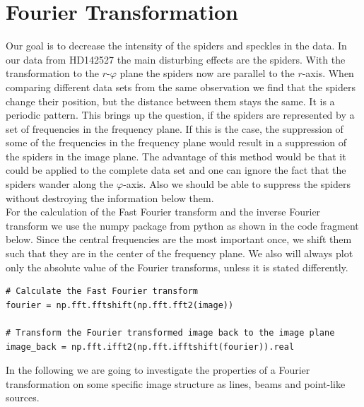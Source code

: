 \section{Fourier Transformation}
\label{sec:fourier}
Our goal is to decrease the intensity of the spiders and speckles in the data. In our data from HD142527 the main disturbing effects are the spiders. With the transformation to the $r$-$\varphi$ plane the spiders now are parallel to the $r$-axis. When comparing different data sets from the same observation we find that the spiders change their position, but the distance between them stays the same. It is a periodic pattern. This brings up the question, if the spiders are represented by a set of frequencies in the frequency plane. If this is the case, the suppression of some of the frequencies in the frequency plane would result in a suppression of the spiders in the image plane. The advantage of this method would be that it could be applied to the complete data set and one can ignore the fact that the spiders wander along the $\varphi$-axis. Also we should be able to suppress the spiders without destroying the information below them.\\
For the calculation of the Fast Fourier transform and the inverse Fourier transform we use the numpy package from python as shown in the code fragment below. Since the central frequencies are the most important once, we shift them such that they are in the center of the frequency plane. We also will always plot only the absolute value of the Fourier transforms, unless it is stated differently. 
\lstset{language=Python, numbers = none}
\begin{lstlisting}[frame=lines]
# Calculate the Fast Fourier transform
fourier = np.fft.fftshift(np.fft.fft2(image))

# Transform the Fourier transformed image back to the image plane
image_back = np.fft.ifft2(np.fft.ifftshift(fourier)).real
\end{lstlisting}
In the following we are going to investigate the properties of a Fourier transformation on some specific image structure as lines, beams and point-like sources.\\

